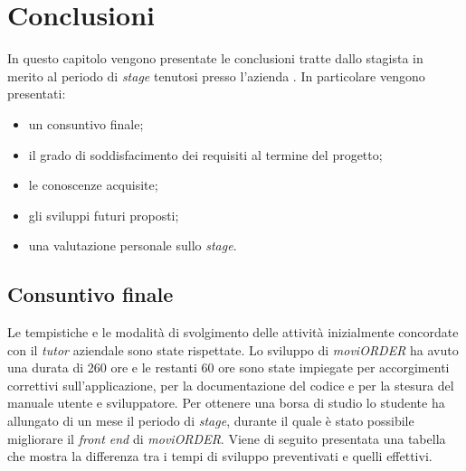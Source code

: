 
\chapter{Conclusioni}
\label{cap:conclusioni}
In questo capitolo vengono presentate le conclusioni tratte dallo stagista in merito al periodo di \textit{stage} tenutosi presso l'azienda \visione{}. In particolare vengono presentati:
\begin{itemize}
	\item un consuntivo finale;
	\item il grado di soddisfacimento dei requisiti al termine del progetto;
	\item le conoscenze acquisite;
	\item gli sviluppi futuri proposti;
	\item una valutazione personale sullo \textit{stage}.
\end{itemize}
\section{Consuntivo finale}

Le tempistiche e le modalità di svolgimento delle attività inizialmente concordate con il \textit{tutor} aziendale sono state rispettate. Lo sviluppo di \textit{moviORDER} ha avuto una durata di 260 ore e le restanti 60 ore sono state impiegate per accorgimenti correttivi sull'applicazione, per la documentazione del codice e per la stesura del manuale utente e sviluppatore. Per ottenere una borsa di studio lo studente ha allungato di un mese il periodo di \textit{stage}, durante il quale è stato possibile migliorare il \textit{front end} di \textit{moviORDER}. Viene di seguito presentata una tabella che mostra la differenza tra i tempi di sviluppo preventivati e quelli effettivi.

